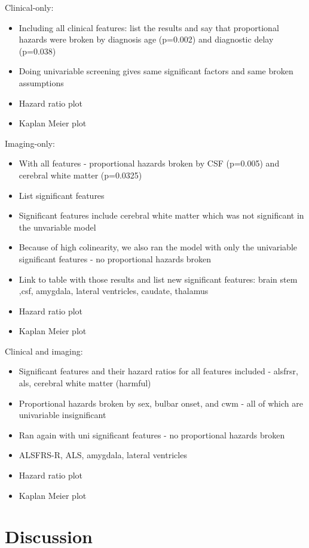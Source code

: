 Clinical-only:
\begin{itemize}
    \item Including all clinical features: list the results and say that proportional hazards were broken by diagnosis age (p=0.002) and diagnostic delay (p=0.038)
    \item Doing univariable screening gives same significant factors and same broken assumptions
    \item Hazard ratio plot
    \item Kaplan Meier plot
\end{itemize}

Imaging-only:
\begin{itemize}
    \item With all features - proportional hazards broken by CSF (p=0.005) and cerebral white matter (p=0.0325)
    \item List significant features
    \item Significant features include cerebral white matter which was not significant in the unvariable model
    \item Because of high colinearity, we also ran the model with only the univariable significant features - no proportional hazards broken
    \item Link to table with those results and list new significant features: brain stem ,csf, amygdala, lateral ventricles, caudate, thalamus
    \item Hazard ratio plot
    \item Kaplan Meier plot
\end{itemize}

Clinical and imaging:
\begin{itemize}
    \item Significant features and their hazard ratios for all features included - alsfrsr, als, cerebral white matter (harmful)
    \item Proportional hazards broken by sex, bulbar onset, and cwm - all of which are univariable insignificant
    \item Ran again with uni significant features - no proportional hazards broken
    \item ALSFRS-R, ALS, amygdala, lateral ventricles
    \item Hazard ratio plot
    \item Kaplan Meier plot
\end{itemize}

\section{Discussion}

